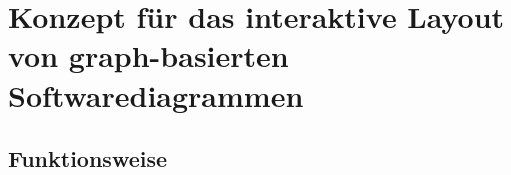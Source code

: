
\chapter{Konzept für das interaktive Layout von graph-basierten Softwarediagrammen}



\section{Funktionsweise}


% 




